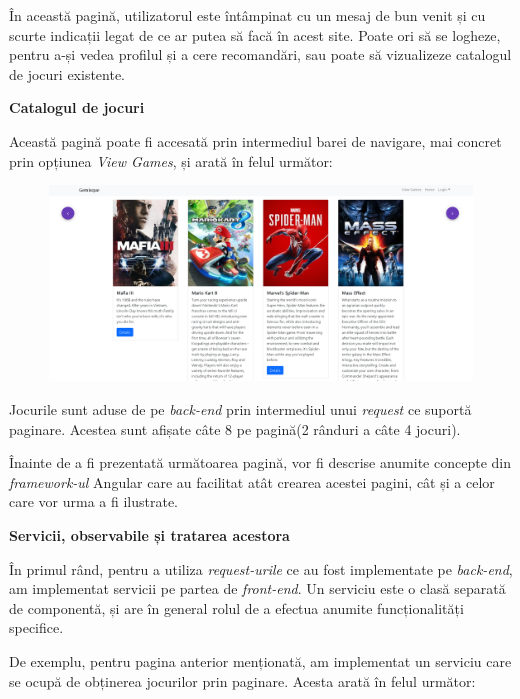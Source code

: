 \documentclass[12pt,a4paper]{report}
\begin{document}
În această pagină, utilizatorul este întâmpinat cu un mesaj de bun venit și cu scurte indicații legat de ce ar putea să facă în acest site. Poate ori să se logheze, pentru a-și  vedea profilul și a cere recomandări, sau poate să vizualizeze catalogul de jocuri existente.

\bigskip
\textbf{Catalogul de jocuri}
\bigskip

Această pagină poate fi accesată prin intermediul barei de navigare, mai concret prin opțiunea \emph{View Games}, și arată în felul următor:

\begin{figure}[H]
\centering
\caption{}
\begin{adjustbox}{max size={\textwidth}{\textheight}}
\includegraphics{exemplu_31_games_catalog}
\end{adjustbox}

\caption*{}
\end{figure}

Jocurile sunt aduse de pe \emph{back-end} prin intermediul unui \emph{request} ce suportă paginare. Acestea sunt afișate câte 8 pe  pagină(2 rânduri a câte 4 jocuri).

Înainte de a fi prezentată următoarea pagină, vor fi descrise anumite concepte din \emph{framework-ul} Angular care au facilitat atât crearea acestei pagini, cât și a celor care vor urma a fi ilustrate.

\bigskip
\textbf{Servicii, observabile și tratarea acestora}
\bigskip

În primul rând, pentru a utiliza \emph{request-urile} ce au fost implementate pe \emph{back-end}, am implementat servicii pe partea de \emph{front-end}. Un serviciu este o clasă separată de componentă, și are în general rolul de a efectua anumite funcționalități specifice. \cite{32}

De exemplu, pentru pagina anterior menționată, am implementat un serviciu care se ocupă de obținerea jocurilor prin paginare. Acesta arată în felul următor:
\end{document}
